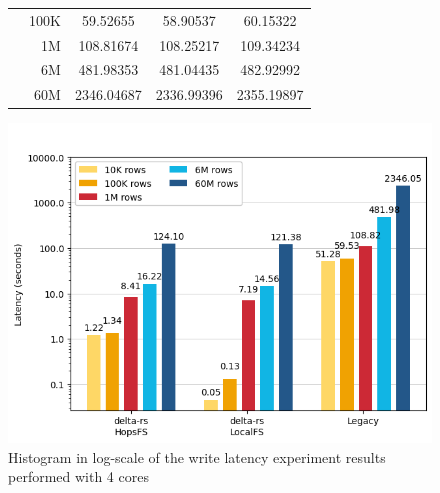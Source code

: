 \begin{figure}
\begin{minipage}[b]{\textwidth}
\begin{tabular}{c r S[table-format=5.5] S[table-format=5.5] S[table-format=5.5]}
                                      & 100K &    59.52655 &   58.90537 &   60.15322\\ 
                                      & 1M   &   108.81674 &  108.25217 &  109.34234\\
                                      & 6M   &   481.98353 &  481.04435 &  482.92992\\
                                      & 60M  &  2346.04687 & 2336.99396 & 2355.19897\\
            \bottomrule
        \end{tabular}
    \end{minipage}
    \begin{minipage}[b]{\textwidth}
        \centering
        \includegraphics[width=\textwidth]{figures/99-appendix/results-diagrams/write/write_time_4_core.png}
        \caption{Histogram in log-scale of the write latency experiment results performed with 4  cores}
        \label{fig:appx_res_write_time_4_cores}
    \end{minipage}
\end{figure}

